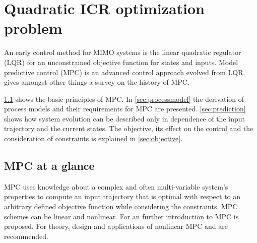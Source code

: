 \chapter{Quadratic ICR optimization problem}
\label{cha:Quadratic}

An early control method for MIMO systems is the linear quadratic regulator (LQR) for an unconstrained objective function for states and inputs.
Model predictive control (MPC) is an advanced control approach evolved from LQR.
\cite{Morari.1999} gives amongst other things a survey on the history of MPC.

\cref{sec:mpc_glance} shows the basic principles of MPC. 
In \cref{sec:processmodel} the derivation of process models and their requirements for MPC are presented.
\cref{sec:prediction} shows how system evolution can be described only in dependence of the input trajectory and the current states.
The objective, its effect on the control and the consideration of constraints is explained in \cref{sec:objective}.


\section{MPC at a glance}
\label{sec:mpc_glance}

MPC uses knowledge about a complex and often multi-variable system's properties to compute an input trajectory that is optimal with respect to an arbitrary defined objective function while considering the constraints.
MPC schemes can be linear and nonlinear.
For an further introduction to MPC \cite{Rawlings.2009} is proposed. For theory, design and applications of nonlinear MPC  \cite{Grune.2011} and \cite{Grancharova.2012b} are recommended.

